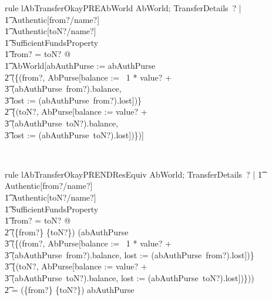 %
\begin{LNewLemma}
\begin{theorem}{rule lAbTransferOkayPREAbWorld}
    \forall AbWorld; TransferDetails~? | \\
        \t1 Authentic[from?/name?] \\
        \t1 \land  Authentic[toN?/name?] \\
        \t1 \land  SufficientFundsProperty \\
        \t1 \land  \lnot  from? = toN? @ \\
        \t1 AbWorld[abAuthPurse := abAuthPurse \oplus \\
            \t2 (\{(from?, \theta  AbPurse[balance := \negate~1 * value? + \\
                \t3 (abAuthPurse~from?).balance, \\
                \t3 lost := (abAuthPurse~from?).lost])\} \\
            \t2 \cup \{(toN?, \theta  AbPurse[balance := value? + \\
                \t3 (abAuthPurse~toN?).balance, \\
                \t3 lost := (abAuthPurse~toN?).lost])\})]
\end{theorem}~\end{LNewLemma}
%
\begin{LNewLemma}
\begin{theorem}{rule lAbTransferOkayPRENDResEquiv}
    \forall AbWorld; TransferDetails~? |
        \t1 Authentic[from?/name?] \\
        \t1 \land  Authentic[toN?/name?] \\
        \t1 \land  SufficientFundsProperty \\
        \t1 \land  \lnot  from? = toN? @ \\
            \t2 (\{from?\} \cup  \{toN?\}) \ndres (abAuthPurse \oplus \\
                \t3 (\{(from?, \theta AbPurse[balance := \negate~1 * value? + \\
                \t3 (abAuthPurse~from?).balance, lost := (abAuthPurse~from?).lost])\} \\
                \t3 \cup  \{(toN?, \theta  AbPurse[balance := value? + \\
                \t3 (abAuthPurse~toN?).balance, lost := (abAuthPurse~toN?).lost])\}))\\
            \t2 = (\{from?\} \cup  \{toN?\}) \ndres  abAuthPurse
\end{theorem}~\end{LNewLemma}

